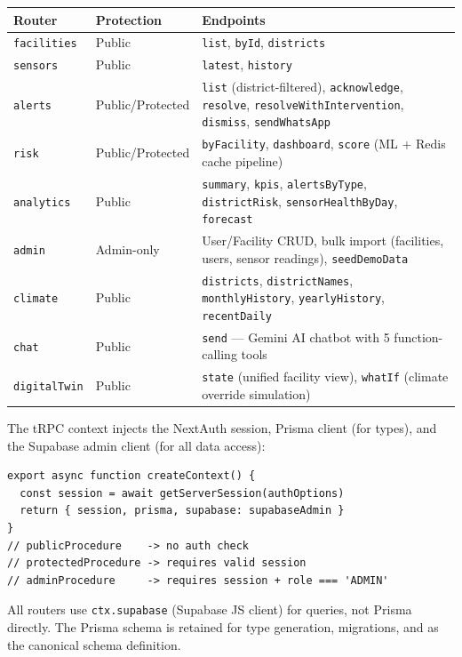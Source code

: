 \documentclass[12pt,a4paper]{report}
\begin{document}
\begin{tabularx}{\textwidth}{llX}
\toprule
\textbf{Router} & \textbf{Protection} & \textbf{Endpoints} \\
\midrule
\texttt{facilities}  & Public            & \texttt{list}, \texttt{byId}, \texttt{districts} \\
\texttt{sensors}     & Public            & \texttt{latest}, \texttt{history} \\
\texttt{alerts}      & Public/Protected  & \texttt{list} (district-filtered), \texttt{acknowledge}, \texttt{resolve}, \texttt{resolveWithIntervention}, \texttt{dismiss}, \texttt{sendWhatsApp} \\
\texttt{risk}        & Public/Protected  & \texttt{byFacility}, \texttt{dashboard}, \texttt{score} (ML + Redis cache pipeline) \\
\texttt{analytics}   & Public            & \texttt{summary}, \texttt{kpis}, \texttt{alertsByType}, \texttt{districtRisk}, \texttt{sensorHealthByDay}, \texttt{forecast} \\
\texttt{admin}       & Admin-only        & User/Facility CRUD, bulk import (facilities, users, sensor readings), \texttt{seedDemoData} \\
\texttt{climate}     & Public            & \texttt{districts}, \texttt{districtNames}, \texttt{monthlyHistory}, \texttt{yearlyHistory}, \texttt{recentDaily} \\
\texttt{chat}        & Public            & \texttt{send} --- Gemini AI chatbot with 5 function-calling tools \\
\texttt{digitalTwin} & Public            & \texttt{state} (unified facility view), \texttt{whatIf} (climate override simulation) \\
\bottomrule
\end{tabularx}

The tRPC context injects the NextAuth session, Prisma client (for types), and the Supabase admin client (for all data access):

\begin{lstlisting}[caption={tRPC context and middleware (server/trpc.ts)}]
export async function createContext() {
  const session = await getServerSession(authOptions)
  return { session, prisma, supabase: supabaseAdmin }
}
// publicProcedure    -> no auth check
// protectedProcedure -> requires valid session
// adminProcedure     -> requires session + role === 'ADMIN'
\end{lstlisting}

\begin{infobox}
All routers use \texttt{ctx.supabase} (Supabase JS client) for queries, not Prisma directly. The Prisma schema is retained for type generation, migrations, and as the canonical schema definition.
\end{infobox}
\end{document}
